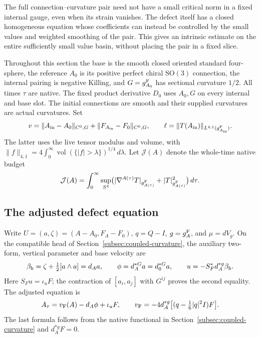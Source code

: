 \documentclass[11pt]{article}
\numberwithin{equation}{section}
\theoremstyle{definition}
\theoremstyle{remark}
\begin{document}
The full connection--curvature pair need not have a small
critical norm in a fixed internal gauge, even when its strain
vanishes. The defect itself has a closed homogeneous equation
whose coefficients can instead be controlled by the small
values and weighted smoothing of the pair. This gives an
intrinsic estimate on the entire sufficiently small value
basin, without placing the pair in a fixed slice.

Throughout this section the base is the smooth closed oriented
standard four-sphere, the reference \(A_0\) is its positive
perfect chiral \(\mathrm{SO}(3)\) connection, the internal
pairing is negative Killing, and
\(G=g^{\rm F}_{A_0}\) has sectional curvature \(1/2\).
All times \(\tau\) are native. The fixed product derivative
\(D_0\) uses \(A_0,G\) on every internal and base slot.
The initial connections are smooth and their supplied
curvatures are actual curvatures. Set
\[
 v=\|A_{\rm in}-A_0\|_{C^0,G}
       +\|F_{A_{\rm in}}-F_0\|_{C^0,G},\qquad
 \ell=\|T(A_{\rm in})\|_{L^{4,1}(g^{\rm F}_{A_{\rm in}})} .
\]
The latter uses the live tensor modulus and volume, with
\(\|f\|_{4,1}=4\int_0^\infty
\operatorname{vol}(\{|f|>\lambda\})^{1/4}\,d\lambda\).
Let \(\mathcal J(A)\) denote the whole-time native budget
\[
 \mathcal J(A)=\int_0^\infty\sup_{S^4}
 \bigl(|\nabla^{A(\tau)}T|_{g^{\rm F}_{A(\tau)}}
                         +|T|_{g^{\rm F}_{A(\tau)}}^2\bigr)\,d\tau .
\]

\subsection{The adjusted defect equation}
\label{subsec:adjusted-defect-endpoint}

Write \(U=(a,\zeta)=(A-A_0,F_A-F_0)\),
\(q=Q-I\), \(g=g^{\rm F}_A\), and \(\mu=dV_g\).
On the compatible head of Section~\ref{subsec:coupled-curvature},
the auxiliary two-form, vertical parameter and base velocity are
\[
 \beta_{\rm h}=\zeta+\tfrac12[a\wedge a]=d_Aa,\qquad
 \phi=d_A^{*G}a=d_0^{*G}a,\qquad
 u=-S_F^*d_A^{*g}\beta_{\rm h}.
\]
Here \(S_Fu=\iota_uF\); the contraction of
\([a_i,a_j]\) with \(G^{ij}\) proves the second equality.
The adjusted equation is
\[
 A_\tau=v_{\rm F}(A)-d_A\phi+\iota_uF,\qquad
 v_{\rm F}=-4d_A^{*g}\bigl[(q-\tfrac16|q|^2I)F\bigr].
\]
The last formula follows from the native functional in
Section~\ref{subsec:coupled-curvature} and
\(d_A^{*g}F=0\).
\end{document}
